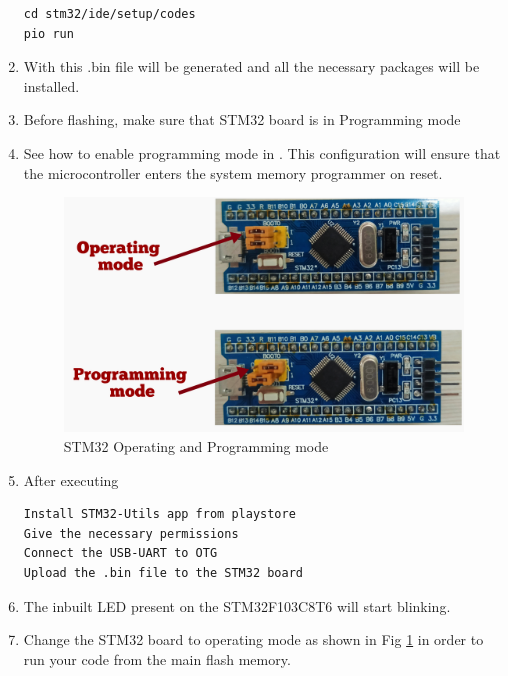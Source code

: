 \begin{enumerate}[label=\arabic*.,ref=\theenumi]
\begin{lstlisting}
cd stm32/ide/setup/codes
pio run
\end{lstlisting}
\item With this .bin file will be generated and all the necessary packages will be installed.
\item Before flashing, make sure that STM32 board is in Programming mode
\item See how to enable programming mode in . This configuration will ensure that the microcontroller enters the system memory programmer on reset.
\begin{figure}[!htb]
\begin{center}
\includegraphics[width=\columnwidth]{stm32/ide/setup/figs/programming_mode.png}
\end{center}
\caption{STM32 Operating and Programming mode}
\label{fig:programming_mode}
\end{figure}
\item After executing 
\begin{lstlisting}
Install STM32-Utils app from playstore
Give the necessary permissions
Connect the USB-UART to OTG
Upload the .bin file to the STM32 board
\end{lstlisting}
\item The inbuilt LED present on the STM32F103C8T6 will start blinking.
\item Change the STM32 board to operating mode as shown in Fig \ref{fig:programming_mode} in order to run your code from the main flash memory.
\end{enumerate}


